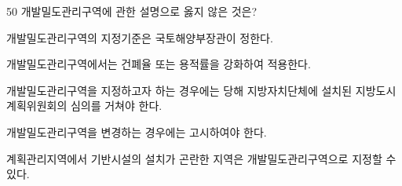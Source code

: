 \begin{question}{50}
개발밀도관리구역에 관한 설명으로 옳지 않은 것은?
\begin{choices}
  \item 개발밀도관리구역의 지정기준은 국토해양부장관이 정한다.
  \item 개발밀도관리구역에서는 건폐율 또는 용적률을 강화하여 적용한다.
  \item 개발밀도관리구역을 지정하고자 하는 경우에는 당해 지방자치단체에 설치된 지방도시계획위원회의 심의를 거쳐야 한다.
  \item 개발밀도관리구역을 변경하는 경우에는 고시하여야 한다.
  \item 계획관리지역에서 기반시설의 설치가 곤란한 지역은 개발밀도관리구역으로 지정할 수 있다.
\end{choices}
\end{question}
